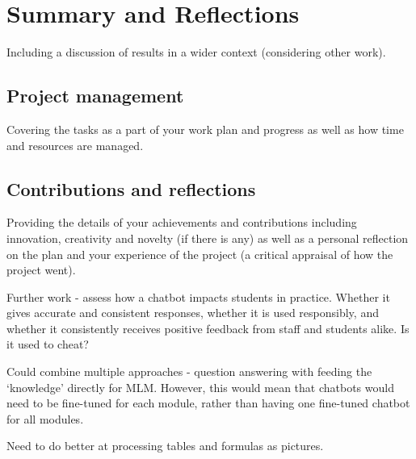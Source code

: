\chapter{Summary and Reflections}

\label{ch:summary}

Including a discussion of results in a wider context (considering other work).


\section{Project management}

Covering the tasks as a part of your work plan and progress as well as how time and resources are managed.


\section{Contributions and reflections}

Providing the details of your achievements and contributions including innovation, creativity and novelty (if there is any) as well as a personal reflection on the plan and your experience of the project (a critical appraisal of how the project went).

Further work - assess how a chatbot impacts students in practice. Whether it gives accurate and consistent responses, whether it is used responsibly, and whether it consistently receives positive feedback from staff and students alike. Is it used to cheat?

Could combine multiple approaches - question answering with feeding the `knowledge' directly for MLM. However, this would mean that chatbots would need to be fine-tuned for each module, rather than having one fine-tuned chatbot for all modules.

Need to do better at processing tables and formulas as pictures.

